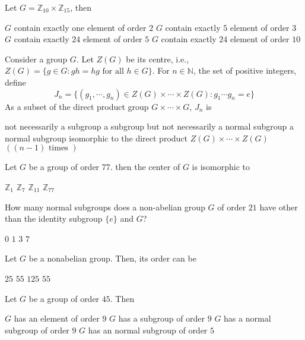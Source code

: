 \documentclass[10pt]{exam}
\begin{document}
\begin{questions}
\question
Let $G=\mathbb{Z}_{10} \times \mathbb{Z}_{15}$, then

\begin{checkboxes}
\choice $G$ contain exactly one element of order $2$
\choice $G$ contain exactly $5$ element of order $3$
\choice $G$ contain exactly $24$ element of order $5$
\choice $G$ contain exactly $24$ element of order $10$
\end{checkboxes}


\question
Consider a group $G$. Let $Z(G)$ be its centre, i.e., $Z(G)=\{g \in G:gh=hg \text{ for all } h \in G \}$. For $n \in \mathbb{N}$, the set of positive integers, define $$J_n = \{(g_1,\cdots, g_n) \in Z(G) \times \cdots \times Z(G):g_1\cdots g_n =e \}$$
As a subset of the direct product group $G \times \cdots \times G$, $J_n$ is 
\begin{choices}
\choice not necessarily a subgroup
\choice a subgroup but not necessarily a normal subgroup
\choice a normal subgroup
\choice isomorphic to the direct product $Z(G) \times \cdots \times Z(G)$ $((n-1) \text{ times })$
\end{choices}


\question
Let $G$ be a group of order $77$. then the center of $G$ is isomorphic to

\begin{oneparchoices}
\choice $\mathbb{Z}_1$
\choice $\mathbb{Z}_7$
\choice $\mathbb{Z}_{11}$
\choice $\mathbb{Z}_{77}$  
\end{oneparchoices}

\question
How many normal subgroups does a non-abelian group $G$ of order $21$ have other than the identity subgroup $\{e\}$ and $G$?

\begin{oneparchoices}
\choice $0$
\choice $1$
\choice $3$
\choice $7$  
\end{oneparchoices}

\question 
Let $G$ be a nonabelian group. Then, its order can be

\begin{oneparcheckboxes}
\choice $25$
\choice $55$
\choice $125$
\choice $55$
\end{oneparcheckboxes}

\question 
Let $G$ be a group of order $45$. Then

\begin{checkboxes}
\choice $G$ has an element of order $9$
\choice $G$ has a subgroup of order $9$
\choice $G$ has a normal subgroup of order $9$
\choice $G$ has an normal subgroup  of order $5$
\end{checkboxes}



\end{questions}
\end{document}
